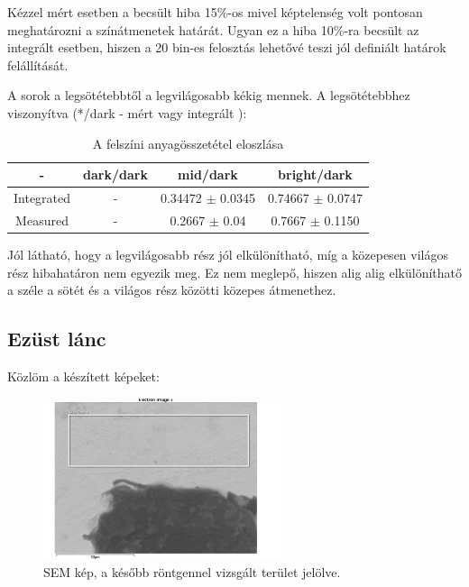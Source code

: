 \documentclass[a4paper,12pt]{article}
\begin{document}
\par Kézzel mért esetben a becsült hiba 15\%-os mivel képtelenség volt
pontosan meghatározni a színátmenetek határát. Ugyan ez a hiba 10\%-ra becsült
az integrált esetben, hiszen a 20 bin-es felosztás lehetővé teszi jól definiált határok
felállítását.

\par A sorok a legsötétebbtől a legvilágosabb kékig mennek. A legsötétebbhez
viszonyítva (*/dark - mért vagy integrált ):

\begin{table}[H]
	\centering
	\begin{tabular}{|c|c|c|c|}  \hline
		- & dark/dark & mid/dark & bright/dark \\ \hline
		Integrated  & - & 0.34472 $\pm$ 0.0345 & 0.74667 $\pm$ 0.0747 \\ \hline
		Measured & - & 0.2667 $\pm$ 0.04 & 0.7667 $\pm$ 0.1150 \\ \hline
	\end{tabular}
	\caption{A felszíni anyagösszetétel eloszlása}
	\label{my-label}
\end{table}

\par Jól látható, hogy a legvilágosabb rész jól elkülönítható, míg a 
közepesen világos rész hibahatáron nem egyezik meg. Ez nem meglepő, hiszen
alig alig elkülöníthatő a széle a sötét és a világos rész közötti közepes
átmenethez.

\subsection{ Ezüst lánc}

\par Közlöm a készített képeket:

\begin{figure}[H]
	\centering
	\includegraphics[width=0.62\textwidth]{./Jcsop/lanc.png}
	\caption{SEM kép, a később röntgennel vizsgált terület jelölve.}
\end{figure}
\end{document}
